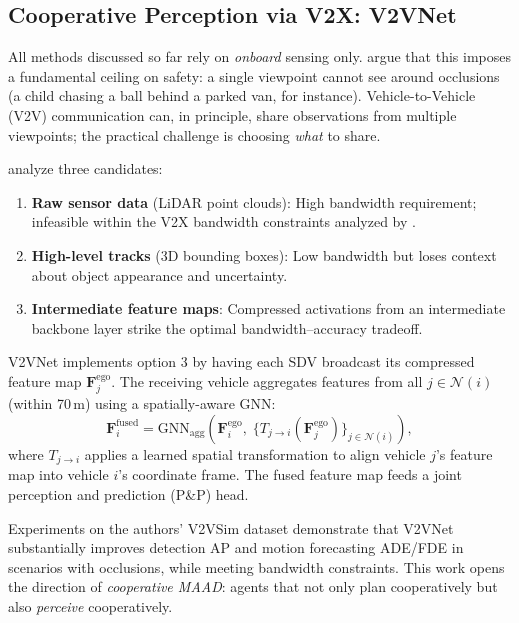 \documentclass[12pt, a4paper]{article}
\begin{document}
\subsection{Cooperative Perception via V2X: V2VNet}
\label{sec:v2vnet}

All methods discussed so far rely on \emph{onboard} sensing only. \citet{wang2020v2vnet}
argue that this imposes a fundamental ceiling on safety: a single viewpoint cannot
see around occlusions (a child chasing a ball behind a parked van, for instance).
Vehicle-to-Vehicle (V2V) communication can, in principle, share observations from
multiple viewpoints; the practical challenge is choosing \emph{what} to share.

\citet{wang2020v2vnet} analyze three candidates:
\begin{enumerate}[noitemsep]
  \item \textbf{Raw sensor data} (LiDAR point clouds): High bandwidth requirement;
        infeasible within the V2X bandwidth constraints analyzed by \citet{wang2020v2vnet}.
  \item \textbf{High-level tracks} (3D bounding boxes): Low bandwidth but loses
        context about object appearance and uncertainty.
  \item \textbf{Intermediate feature maps}: Compressed activations from an
        intermediate backbone layer strike the optimal bandwidth--accuracy tradeoff.
\end{enumerate}
V2VNet implements option 3 by having each SDV broadcast its compressed feature map
$\mathbf{F}_j^{\text{ego}}$. The receiving vehicle aggregates features from all
$j \in \mathcal{N}(i)$ (within 70\,m) using a spatially-aware GNN:
\begin{equation}
  \mathbf{F}_i^{\text{fused}}
  = \text{GNN}_{\text{agg}}\!\left(
      \mathbf{F}_i^{\text{ego}},\;
      \{T_{j \to i}(\mathbf{F}_j^{\text{ego}})\}_{j \in \mathcal{N}(i)}
    \right),
\end{equation}
where $T_{j \to i}$ applies a learned spatial transformation to align vehicle
$j$'s feature map into vehicle $i$'s coordinate frame. The fused feature map
feeds a joint perception and prediction (P\&P) head.

Experiments on the authors' V2VSim dataset demonstrate that V2VNet substantially
improves detection AP and motion forecasting ADE/FDE in scenarios with occlusions,
while meeting bandwidth constraints. This work opens the direction of
\emph{cooperative MAAD}: agents that not only plan cooperatively but also
\emph{perceive} cooperatively.
\end{document}
